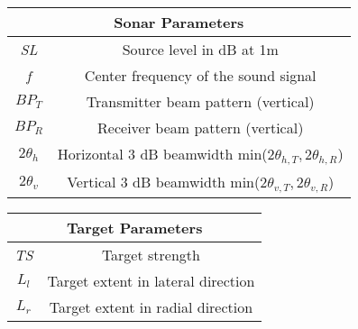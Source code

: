 \begin{center}
\begin{tabular}{ |c|c| } 
 \hline
 \multicolumn{2}{|c|}{Sonar Parameters} \\
 \hline
  \textit{SL} & Source level in dB at 1m  \\ 
  \textit{f} & Center frequency of the sound signal  \\ 
  \textit{$BP_T$} & Transmitter beam pattern (vertical)  \\ 
  \textit{$BP_R$} & Receiver beam pattern (vertical)  \\ 
  $2 \theta_{h}$ & Horizontal 3 dB beamwidth min($2\theta_{h,T}, 2\theta_{h,R}$) \\
   $2 \theta_{v}$ & Vertical 3 dB beamwidth min($2\theta_{v,T}, 2\theta_{v,R}$) \\
  \hline
\end{tabular}
\end{center}

\begin{center}
\begin{tabular}{ |c|c| } 
 \hline
 \multicolumn{2}{|c|}{Target Parameters} \\
 \hline
  \textit{TS} & Target strength  \\ 
  \textit{$L_l$} & Target extent in lateral direction \\ 
  \textit{$L_r$} & Target extent in radial direction \\ 
  \hline
\end{tabular}
\end{center}

